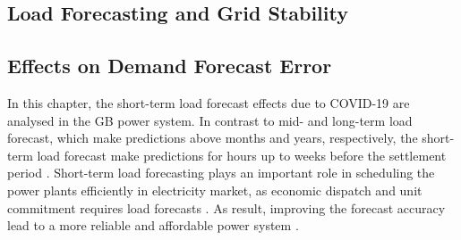 \documentclass[energies,article,submit,moreauthors,pdftex]{Definitions/mdpi}
\begin{document}


\subsection{Load Forecasting and Grid Stability}
\subsection{Effects on Demand Forecast Error}\label{DemandForecastError}
In this chapter, the short-term load forecast effects due to COVID-19 are analysed in the GB power system. In contrast to mid- and long-term load forecast, which make predictions above months and years, respectively, the short-term load forecast make predictions for hours up to weeks before the settlement period \cite{SahayDayNetwork,Khuntia2016ForecastingReview}. Short-term load forecasting plays an important role in scheduling the power plants efficiently in electricity market, as economic dispatch and unit commitment requires load forecasts \cite{He2020Day-aheadForest}. As result, improving the forecast accuracy lead to a more reliable and affordable power system \cite{SahayDayNetwork}. 
\end{document}
